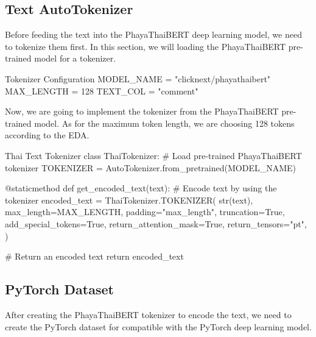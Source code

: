 \documentclass[12pt, a4paper]{article}
\begin{document}
            \subsection{Text AutoTokenizer}
                Before feeding the text into the PhayaThaiBERT deep learning model, we need to tokenize them first.
                In this section, we will loading the PhayaThaiBERT pre-trained model for a tokenizer.

                \begin{codeblock}{Tokenizer Configuration}
                    MODEL_NAME = "clicknext/phayathaibert"
                    MAX_LENGTH = 128
                    TEXT_COL = "comment"
                \end{codeblock}

                Now, we are going to implement the tokenizer from the PhayaThaiBERT pre-trained model.
                As for the maximum token length, we are choosing 128 tokens according to the EDA.

                \begin{codeblock}{Thai Text Tokenizer}
                    class ThaiTokenizer:
                        # Load pre-trained PhayaThaiBERT tokenizer
                        TOKENIZER = AutoTokenizer.from_pretrained(MODEL_NAME)

                        @staticmethod
                        def get_encoded_text(text):
                            # Encode text by using the tokenizer
                            encoded_text = ThaiTokenizer.TOKENIZER(
                                str(text),
                                max_length=MAX_LENGTH,
                                padding="max_length",
                                truncation=True,
                                add_special_tokens=True,
                                return_attention_mask=True,
                                return_tensors="pt",
                            )

                            # Return an encoded text
                            return encoded_text
                \end{codeblock}

    \pagebreak

            \subsection{PyTorch Dataset}
                After creating the PhayaThaiBERT tokenizer to encode the text, we need to create the PyTorch
                dataset for compatible with the PyTorch deep learning model.
\end{document}

